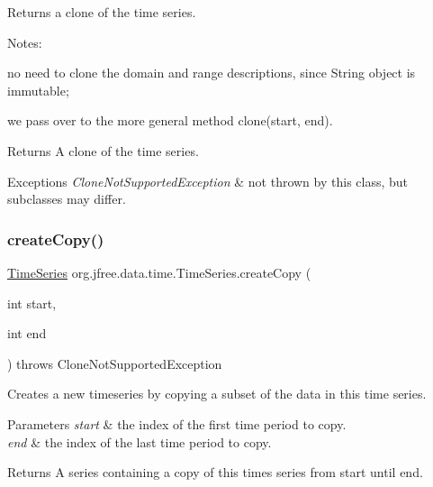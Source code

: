 Returns a clone of the time series. 

Notes\+: 
\begin{DoxyItemize}
\item no need to clone the domain and range descriptions, since String object is immutable; 
\item we pass over to the more general method clone(start, end). 
\end{DoxyItemize}

\begin{DoxyReturn}{Returns}
A clone of the time series.
\end{DoxyReturn}

\begin{DoxyExceptions}{Exceptions}
{\em Clone\+Not\+Supported\+Exception} & not thrown by this class, but subclasses may differ. \\
\hline
\end{DoxyExceptions}
\mbox{\label{classorg_1_1jfree_1_1data_1_1time_1_1_time_series_a2389b70a57490783373cd5de88d00f13}} 
\subsubsection{\texorpdfstring{create\+Copy()}{createCopy()}\hspace{0.1cm}{\footnotesize\ttfamily [1/2]}}
{\footnotesize\ttfamily \mbox{\hyperlink{classorg_1_1jfree_1_1data_1_1time_1_1_time_series}{Time\+Series}} org.\+jfree.\+data.\+time.\+Time\+Series.\+create\+Copy (\begin{DoxyParamCaption}\item[{int}]{start,  }\item[{int}]{end }\end{DoxyParamCaption}) throws Clone\+Not\+Supported\+Exception}

Creates a new timeseries by copying a subset of the data in this time series.


\begin{DoxyParams}{Parameters}
{\em start} & the index of the first time period to copy. \\
\hline
{\em end} & the index of the last time period to copy.\\
\hline
\end{DoxyParams}
\begin{DoxyReturn}{Returns}
A series containing a copy of this times series from start until end.
\end{DoxyReturn}

